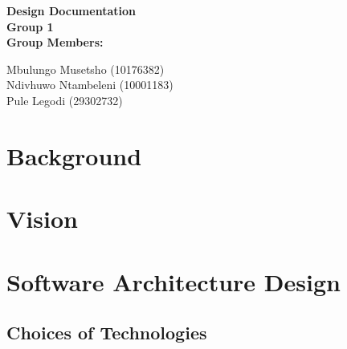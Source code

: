 \documentclass[12pt]{article}
\newcommand{\Title}{Design Documentation} %
\begin{document}
	\vspace{4em}
	
	\begin{center}%
	
	  \LARGE \bf \Title \\[4em]
	  \LARGE {\bf Group 1}\\[1em]
	  \LARGE {\bf Group Members:}\\[2em]
	  \large
	  
	     Mbulungo Musetsho				(10176382) \\[1em]
	     Ndivhuwo Ntambeleni			(10001183) \\[1em]
	     Pule Legodi                                (29302732) \\[1em]
	    
	\end{center}%
	

	\newpage
	\tableofcontents
	
	\newpage
	\section{Background}
	
		\vspace{0.2in}
	
		
		 
	
	\section{Vision}
	
		\vspace{0.2in}
		
				
	
	\section{Software Architecture Design}
		\vspace{0.2in}
		
		\subsection{Choices of Technologies}
			\vspace{0.2in}
		
\end{document}
